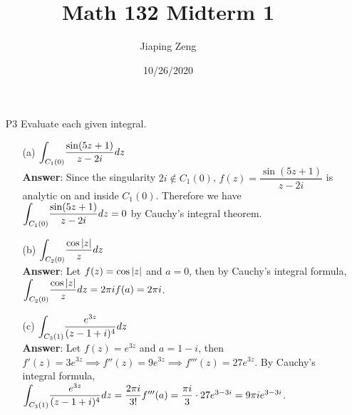 \documentclass{article}
\title{Math 132 Midterm 1}
\author{Jiaping Zeng}
\date{10/26/2020}
\begin{document}

\newpage
\begin{itemize}
    \item [P3] Evaluate each given integral.
          \begin{itemize}
              \item [(a)] $\mathlarger{\int_{C_1(0)}}\dfrac{\sin(5z+1)}{z-2i}dz$\\
                    \textbf{Answer}: Since the singularity $2i\notin C_1(0)$, $f(z)=\dfrac{\sin(5z+1)}{z-2i}$ is analytic on and inside $C_1(0)$. Therefore we have $\mathlarger{\int_{C_1(0)}}\dfrac{\sin(5z+1)}{z-2i}dz=0$ by Cauchy's integral theorem.
              \item [(b)] $\mathlarger{\int_{C_2(0)}}\dfrac{\cos\abs{z}}{z}dz$\\
                    \textbf{Answer}: Let $f(z)=\cos\abs{z}$ and $a=0$, then by Cauchy's integral formula, $\mathlarger{\int_{C_2(0)}}\dfrac{\cos\abs{z}}{z}dz=2\pi if(a)=2\pi i$.
              \item [(c)] $\mathlarger{\int_{C_3(1)}}\dfrac{e^{3z}}{(z-1+i)^4}dz$\\
                    \textbf{Answer}: Let $f(z)=e^{3z}$ and $a=1-i$, then $f'(z)=3e^{3z}\implies f''(z)=9e^{3z}\implies f'''(z)=27e^{3z}$. By Cauchy's integral formula, $\mathlarger{\int_{C_3(1)}}\dfrac{e^{3z}}{(z-1+i)^4}dz=\dfrac{2\pi i}{3!}f'''(a)=\dfrac{\pi i}{3}\cdot 27e^{3-3i}=9\pi ie^{3-3i}$.
          \end{itemize}
\end{itemize}
\end{document}
